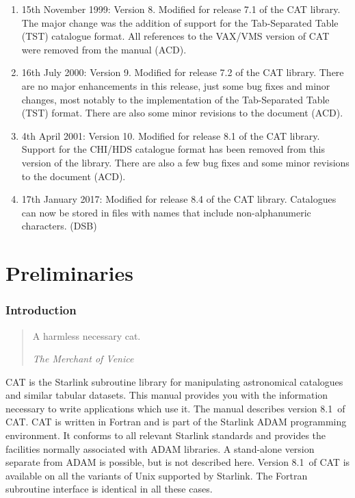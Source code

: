 \documentclass[11pt,twoside]{starlink}
\providecommand{\CATversion}{8.1~}
\begin{document}
\begin{enumerate}
  \item 15th November 1999: Version 8. Modified for release 7.1 of the
   CAT library.  The major change was the addition of support for the
   Tab-Separated Table (TST) catalogue format.  All references to
   the VAX/VMS version of CAT were removed from the manual (ACD).

  \item 16th July 2000: Version 9.  Modified for release 7.2 of the
   CAT library.  There are no major enhancements in this release, just
   some bug fixes and minor changes, most notably to the implementation
   of the Tab-Separated Table (TST) format.  There are also some minor
   revisions to the document (ACD).

  \item 4th April 2001: Version 10.  Modified for release 8.1 of the
   CAT library.  Support for the CHI/HDS catalogue format has been removed
   from this version of the library.  There are also a few bug fixes and
   some minor revisions to the document (ACD).

  \item 17th January 2017: Modified for release 8.4 of the CAT library.
   Catalogues can now be stored in files with names that include
   non-alphanumeric characters. (DSB)

\end{enumerate}


\part{Preliminaries}


\section{\label{INTRO}Introduction}

\begin{quote}
\begin{center}
A harmless necessary cat.
\end{center}
\textit{The Merchant of Venice} \latex{\raggedleft}
\end{quote}


CAT is the Starlink subroutine library for manipulating astronomical
catalogues and similar tabular datasets. This manual provides you with
the information necessary to write applications which use it. The manual
describes version \CATversion of CAT. CAT is written in Fortran
and is part of the Starlink ADAM programming environment. It conforms
to all relevant Starlink standards and provides the facilities normally
associated with ADAM libraries. A stand-alone version separate from ADAM
is possible, but is not described here. Version \CATversion of CAT is
available on all the variants of Unix supported by Starlink.  The Fortran
subroutine interface is identical in all these cases.
\end{document}
